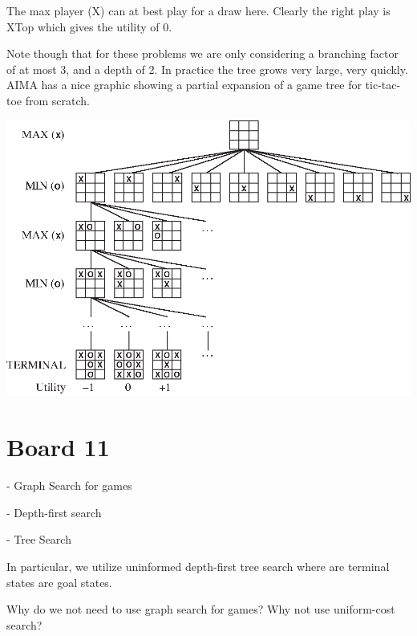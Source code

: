 \documentclass[11pt]{article}
\begin{document}
The max player (X) can at best play for a draw here. 
Clearly the right play is XTop which gives the utility of 0. 

Note though that for these problems we are only considering a branching factor of at most 3, and a depth of 2. In practice the tree grows very large, very quickly.
AIMA has a nice graphic showing a partial  expansion of a game tree for tic-tac-toe from scratch. 

\begin{center}
  \includegraphics{../pics/tictactoe}
\end{center}

\section{Board 11}


- Graph Search for games 

- Depth-first search

- Tree Search

In particular, we utilize uninformed depth-first tree search where are terminal states are goal states. 
\begin{exercise}
  Why do we not need to use graph search for games? Why not use uniform-cost search?
\end{exercise}
\end{document}

